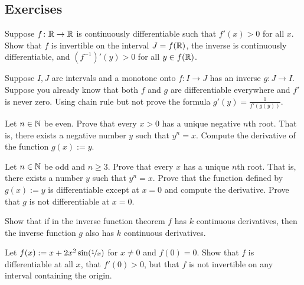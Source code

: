 \subsection{Exercises}

\begin{exercise}
Suppose $f \colon {\mathbb{R}} \to {\mathbb{R}}$ is continuously differentiable such that
$f'(x) > 0$ for all $x$.  Show that $f$ is invertible on the interval $J =
f({\mathbb{R}})$, the inverse is continuously differentiable, and ${(f^{-1})}'(y) >
0$ for all $y \in f({\mathbb{R}})$.
\end{exercise}

\begin{exercise}
Suppose $I,J$ are intervals and a monotone onto $f \colon I \to J$ has an inverse $g \colon J \to I$.
Suppose you already know that both $f$ and $g$ are differentiable
everywhere and $f'$ is never zero.  Using chain rule but not  prove the
formula $g'(y) = \frac{1}{f'(g(y))}$. %
\end{exercise}

\begin{exercise}
Let $n\in {\mathbb{N}}$ be even.
Prove that every $x > 0$ has a unique negative $n$th root.
That is, there exists a negative number $y$ such that $y^n = x$.
Compute the derivative
of the function $g(x) := y$.
\end{exercise}

\begin{exercise} \label{exercise:oddroot}
Let $n \in {\mathbb{N}}$ be odd and $n \geq 3$.
Prove that every $x$ has a unique $n$th root.
That is, there exists a number $y$ such that $y^n = x$.  Prove that
the function defined by $g(x) := y$ is differentiable except at $x=0$
and compute the derivative.  Prove that $g$ is not differentiable at $x=0$.
\end{exercise}

\begin{exercise}
Show that if in the inverse function theorem $f$ has $k$ continuous
derivatives, then the inverse function $g$ also has $k$ continuous
derivatives.
\end{exercise}

\begin{exercise}
Let $f(x) := x + 2 x^2 \sin(\nicefrac{1}{x})$ for $x \not= 0$ and
$f(0) = 0$.  Show that $f$ is differentiable at all $x$, that $f'(0) > 0$,
but that $f$ is not invertible
on any interval containing the origin.
\end{exercise}


